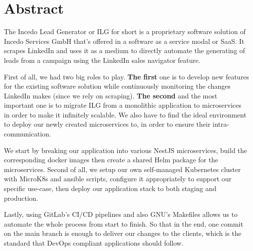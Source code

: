 \section*{Abstract}
The Incedo Lead Generator or ILG for short is a proprietary software solution of Incedo Services GmbH that's offered in a software as a service modal or SaaS.
It scrapes LinkedIn and uses it as a medium to directly automate the generating of leads from a campaign using the LinkedIn sales navigator feature.

\medskip
\noindent First of all, we had two big roles to play.
\textbf{The first} one is to develop new features for the existing software solution while continuously monitoring the changes LinkedIn makes (since we rely on scraping).
\textbf{The second} and the most important one is to migrate ILG from a monolithic application to microservices in order to make it infinitely scalable. We also have to find the ideal environment to deploy our newly created microservices to, in order to ensure their intra-communication.

\medskip
\noindent We start by breaking our application into various NestJS microservices, build the corresponding docker images then create a shared Helm package for the microservices. Second of all, we setup our own self-managed Kubernetes cluster with MicroK8s and ansible scripts, configure it appropriately to support our specific use-case, then deploy our application stack to both staging and production.

\medskip
\noindent Lastly, using GitLab's CI/CD pipelines and also GNU's Makefiles allows us to automate the whole process from start to finish. So that in the end, one commit on the main branch is enough to deliver our changes to the clients, which is the standard that DevOps compliant applications should follow.

\newpage
